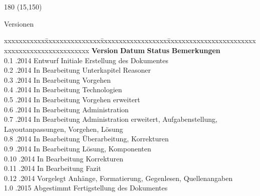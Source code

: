 
\chapter*{}
\label{chap:versionen}

\begin{textblock}{180} (15,150)
\color{black}
\begin{huge}
Versionen
\end{huge}
\vspace{10mm}

\fontsize{10pt}{18pt}\selectfont
\begin{tabbing}
xxxxxxxxxxx\=xxxxxxxxxxxxxxx\=xxxxxxxxxxxxxxxxxx\=xxxxxxxxxxxxxxxxxxxxxxxxxxxxxxxxxxxxxxxxxxxxxxx \kill
\textbf{Version}	\> \textbf{Datum}	\> \textbf{Status}		\> \textbf{Bemerkungen}		\\
0.1	.2014	\> Entwurf		\> Initiale Erstellung des Dokumentes	\\	
0.2	.2014	\> In Bearbeitung		\> Unterkapitel Reasoner	\\	
0.3	.2014	\> In Bearbeitung		\> Vorgehen	\\	
0.4	.2014	\> In Bearbeitung		\> Technologien	\\
0.5	.2014	\> In Bearbeitung		\> Vorgehen erweitert	\\	
0.6	.2014	\> In Bearbeitung		\> Administration	\\ 
0.7	.2014	\> In Bearbeitung		\> Administration erweitert, Aufgabenstellung, \\
    \>              \>              	\> Layoutanpassungen, Vorgehen, Lösung \\
0.8	.2014	\> In Bearbeitung		\> Überarbeitung, Korrekturen \\
0.9	.2014	\> In Bearbeitung		\> Lösung, Komponenten \\
0.10	.2014	\> In Bearbeitung		\> Korrekturen \\
0.11	.2014	\> In Bearbeitung		\> Fazit \\
0.12	.2014	\> Vorgelegt		\> Anhänge, Formatierung, Gegenlesen, Quellenangaben \\
1.0 .2015\> Abgestimmt \> Fertigstellung des Dokumentes
\end{tabbing}

\end{textblock}
